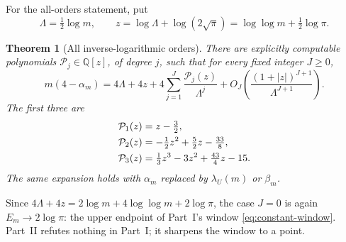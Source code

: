 \documentclass[11pt,a4paper]{article}
\newtheorem{theorem}{Theorem}[section]
\theoremstyle{definition}\newaliascnt{definition}{theorem}
\theoremstyle{remark}\newaliascnt{remark}{theorem}
\begin{document}
For the all-orders statement, put
\begin{equation}
 \Lambda=\tfrac12\log m,\qquad
 z=\log\Lambda+\log(2\sqrt\pi)
   =\log\log m+\tfrac12\log\pi.
 \label{crem:eq:Lz}
\end{equation}
\begin{theorem}[All inverse-logarithmic orders]\label{crem:thm:main-allorders}
There are explicitly computable polynomials $\mathcal P_j\in\mathbb Q[z]$, of
degree $j$, such that for every fixed integer $J\ge0$,
\begin{equation}
 m(4-\alpha_m)
 =4\Lambda+4z+4\sum_{j=1}^{J}\frac{\mathcal P_j(z)}{\Lambda^j}
 +O_J\!\left(\frac{(1+|z|)^{J+1}}{\Lambda^{J+1}}\right).
 \label{crem:eq:main-allorders}
\end{equation}
The first three are
\begin{align}
 \mathcal P_1(z)&=z-\tfrac32,\notag\\
 \mathcal P_2(z)&=-\tfrac12z^2+\tfrac52z-\tfrac{33}{8},\notag\\
 \mathcal P_3(z)&=\tfrac13z^3-3z^2+\tfrac{43}{4}z-15.
 \label{crem:eq:first-polynomials}
\end{align}
The same expansion holds with $\alpha_m$ replaced by $\lambda_U(m)$ or
$\beta_m$.
\end{theorem}

Since $4\Lambda+4z=2\log m+4\log\log m+2\log\pi$, the case $J=0$ is again
$E_m\to2\log\pi$: the upper endpoint of Part~I's window
\eqref{eq:constant-window}. Part~II refutes nothing in Part~I; it sharpens
the window to a point.
\end{document}
